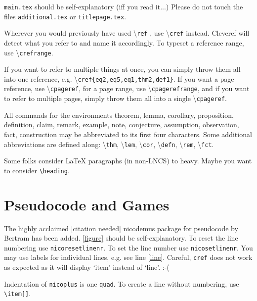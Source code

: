 
\verb|main.tex| should be self-explanatory (iff you read it...) Please do not touch the files \verb|additional.tex| or \verb|titlepage.tex|.

 Wherever  you  would  previously  have  used \textbackslash\verb|ref|
, use \textbackslash\verb|cref| instead. Cleveref will detect what you refer to and name it accordingly. To typeset a reference range, use \textbackslash\verb|crefrange|.

If you want to refer to multiple things at once, you can simply  throw  them  all  into  one  reference, e.g. \textbackslash\verb|cref{eq2,eq5,eq1,thm2,def1}|. If you want a page  reference,  use \textbackslash\verb|cpageref|, for a page range, use \textbackslash\verb|cpagerefrange|, and if you want to refer to multiple pages, simply throw them all into a single \textbackslash\verb|cpageref|.\medskip

All commands for the environments theorem, lemma, corollary, proposition, definition, claim, remark, example, note, conjecture, assumption, observation, fact, construction may be abbreviated to its first four characters. Some additional abbreviations are defined along: \textbackslash\verb|thm|, \textbackslash\verb|lem|, \textbackslash\verb|cor|, \textbackslash\verb|defn|, \textbackslash\verb|rem|, \textbackslash\verb|fct|.

Some folks consider LaTeX paragraphs (in non-LNCS) to heavy. Maybe you want to consider \verb|\heading|.\medskip

\section{Pseudocode and Games}
The highly acclaimed [citation needed] nicodemus package for pseudocode by Bertram has been added. \cref{figure} should be self-explanatory. To reset the line numbering use \verb|nicoresetlinenr|. To set the line number use \verb|nicosetlinenr|. You may use labels for individual lines, e.g. see line \ref{line}. Careful, \verb|cref| does not work as expected as it will display `item' instead of `line'. :-(

Indentation of \verb|nicoplus| is one \verb|quad|. To create a line without numbering, use \verb|\item[]|.

